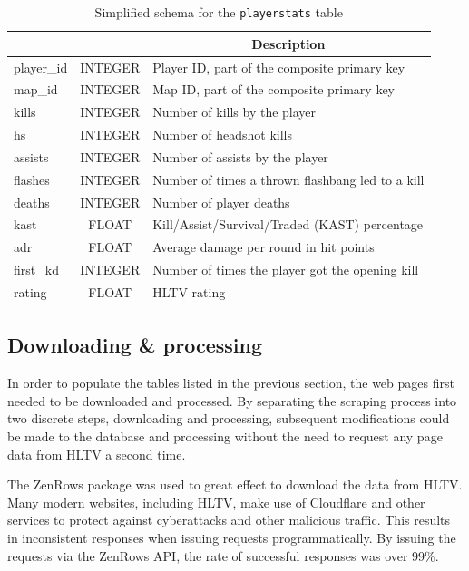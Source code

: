 \begin{table}[h!]
	\centering
	\caption{Simplified schema for the \texttt{playerstats} table}
	\renewcommand{\arraystretch}{1.2} %
	\begin{tabular}{|>{\ttfamily}l|>{\ttfamily}c|l|}
		\hline
		\multicolumn{1}{|c|}{\textnormal{\textbf{Field}}} & \multicolumn{1}{c|}{\textnormal{\textbf{Type}}} & \multicolumn{1}{c|}{\textbf{Description}} \\
		\hline
		player\_id & INTEGER & Player ID, part of the composite primary key \\
		\hline
		map\_id & INTEGER & Map ID, part of the composite primary key \\
		\hline
		kills & INTEGER & Number of kills by the player \\
		\hline
		hs & INTEGER & Number of headshot kills \\
		\hline
		assists & INTEGER & Number of assists by the player \\
		\hline
		flashes & INTEGER & Number of times a thrown flashbang led to a kill \\
		\hline
		deaths & INTEGER & Number of player deaths \\
		\hline
		kast & FLOAT & Kill/Assist/Survival/Traded (KAST) percentage \\
		\hline
		adr & FLOAT & Average damage per round in hit points \\
		\hline
		first\_kd & INTEGER & Number of times the player got the opening kill\\
		\hline
		rating & FLOAT & HLTV rating \\
		\hline
	\end{tabular}
	\label{tab:playerstats}
\end{table}

\newpage

\subsection{Downloading \& processing}

In order to populate the tables listed in the previous section, the web pages first needed to be downloaded and processed. By separating the scraping process into two discrete steps, downloading and processing, subsequent modifications could be made to the database and processing without the need to request any page data from HLTV a second time. 

The ZenRows package was used to great effect to download the data from HLTV. Many modern websites, including HLTV, make use of Cloudflare and other services to protect against cyberattacks and other malicious traffic. This results in inconsistent responses when issuing requests programmatically. By issuing the requests via the ZenRows API, the rate of successful responses was over 99\%. 

